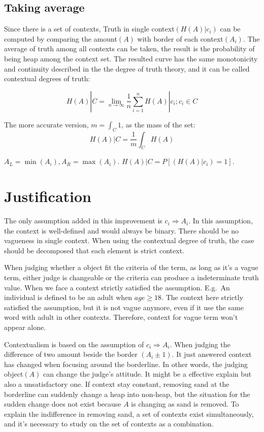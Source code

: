 \documentclass{article}
\begin{document}
\subsection{Taking average}
Since there is a set of contexts, Truth in single context$(H(A)|c_i)$ can be computed by comparing the amount$(A)$ with border of each context$(A_i)$. The average of truth among all contexts can be taken, the result is the probability of being heap among the context set. The resulted curve has the same monotonicity and continuity described in the the degree of truth theory, and it can be called contextual degrees of truth:

\[H(A)|C=\lim_{n\to \infty}\frac{1}{n}\sum_{i=1}^{n}H(A)|c_i; c_i\in C\]

The more accurate version, $m=\int_C 1$, as the mass of the set:
\[H(A)|C=\frac{1}{m}\int_C H(A)\]

$A_L=\min(A_i),A_R=\max(A_i)$. $H(A)|C = P[(H(A)|c_i) = 1]$.

\section{Justification}

The only assumption added in this improvement is $c_i\Rightarrow A_i$. In this assumption, the context is well-defined and would always be binary. There should be no vagueness in single context. When using the contextual degree of truth, the case should be decomposed that each element is strict context.

When judging whether a object fit the criteria of the term, as long as it's a vague term, either judge is changeable or the criteria can produce a indeterminate truth value. When we face a context strictly satisfied the assumption. E.g.\ An individual is defined to be an adult when $age\geq 18$. The context here strictly satisfied the assumption, but it is not vague anymore, even if it use the same word with adult in other contexts. Therefore, context for vague term won't appear alone.

Contextualism is based on the assumption of $c_i\Rightarrow A_i$. When judging the difference of two amount beside the border $(A_i\pm 1)$. It just answered context has changed when focusing around the borderline. In other words, the judging object$(A)$ can change the judge's attitude. It might be a effective explain but also a unsatisfactory one. If context stay constant, removing sand at the borderline can suddenly change a heap into non-heap, but the situation for the sudden change does not exist because $A$ is changing as sand is removed. To explain the indifference in removing sand, a set of contexts exist simultaneously, and it's necessary to study on the set of contexts as a combination.
\end{document}

